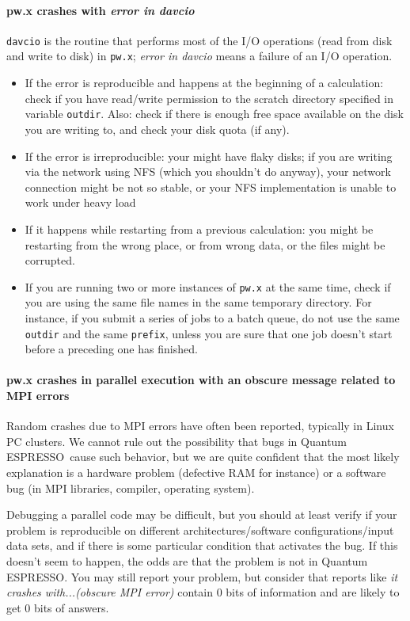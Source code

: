 \documentclass[12pt,a4paper]{article}
\def\qe{{\sc Quantum ESPRESSO}}
\def\pw.x{\texttt{pw.x}}
\begin{document}
\paragraph{pw.x crashes with {\em error in davcio}}
\texttt{davcio} is the routine that performs most of the I/O operations (read
from disk and write to disk) in \pw.x; {\em error in davcio} means a
failure of an I/O operation. 
\begin{itemize}
\item If the error is reproducible and happens at the beginning of a
  calculation: check if you have read/write permission to the scratch
  directory specified in variable \texttt{outdir}. Also: check if there is
  enough free space available on the disk you are writing to, and
  check your disk quota (if any).
\item If the error is irreproducible: your might have flaky disks; if
  you are writing via the network using NFS (which you shouldn't do
  anyway), your network connection might be not so stable, or your 
  NFS implementation is unable to work under heavy load 
\item If it happens while restarting from a previous calculation: you
  might be restarting from the wrong place, or from wrong  data, or
  the files might be corrupted. 
\item If you are running two or more instances of \texttt{pw.x} at
  the same time, check if you are using the same file names in the 
  same temporary directory. For instance, if you submit a series of
  jobs to a batch queue, do not use the same \texttt{outdir} and
  the same \texttt{prefix}, unless you are sure that one job doesn't
  start before a preceding one has finished.
\end{itemize}

\paragraph{pw.x crashes in parallel execution with an obscure message
  related to MPI errors} 
Random crashes due to MPI errors have often been reported, typically
in Linux PC clusters. We cannot rule out the possibility that bugs in
\qe\ cause such behavior, but we are quite confident that
the most likely explanation is a hardware problem (defective RAM  
for instance) or a software bug (in MPI libraries, compiler, operating
system). 

Debugging a parallel code may be difficult, but you should at least
verify if your problem is reproducible on different
architectures/software configurations/input data sets, and if  
there is some particular condition that activates the bug. If this
doesn't seem to happen, the odds are that the problem is not in
\qe. You may still report your problem, 
but consider that reports like {\em it crashes with...(obscure MPI error)}
contain 0 bits of information and are likely to get 0 bits of answers.
\end{document}
